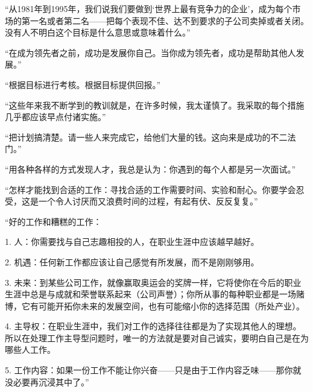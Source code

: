 “从1981年到1995年，我们说我们要做到‘世界上最有竞争力的企业’，成为每个市场的第一名或者第二名——把每个表现不佳、达不到要求的子公司卖掉或者关闭。没有人不明白这个目标是什么意思或意味着什么。”
\par

“在成为领先者之前，成功是发展你自己。当你成为领先者，成功是帮助其他人发展。”
\par

“根据目标进行考核。根据目标提供回报。”
\par

“这些年来我不断学到的教训就是，在许多时候，我太谨慎了。我采取的每个措施几乎都应该早点付诸实施。”
\par

“把计划搞清楚。请一些人来完成它，给他们大量的钱。这向来是成功的不二法门。”
\par

“用各种各样的方式发现人才，我总是认为：你遇到的每个人都是另一次面试。”
\par

“怎样才能找到合适的工作：寻找合适的工作需要时间、实验和耐心。你要学会忍受，这是一个令人讨厌而又浪费时间的过程，有起有伏、反反复复。”
\par

“好的工作和糟糕的工作：
\par

1. 人：你需要找与自己志趣相投的人，在职业生涯中应该越早越好。
\par

2. 机遇：任何新工作都应该让自己感觉有所发展，而不是刚刚够用。
\par

3. 未来：到某些公司工作，就像赢取奥运会的奖牌一样，它将使你在今后的职业生涯中总是与成就和荣誉联系起来（公司声誉）；你所从事的每种职业都是一场赌博，它有可能开拓你未来的发展空间，也有可能缩小你的选择范围（所处产业）。
\par

4. 主导权：在职业生涯中，我们对工作的选择往往都是为了实现其他人的理想。所以在处理工作主导型问题时，唯一的方法就是要对自己诚实，要明白自己是在为哪些人工作。
\par

5. 工作内容：如果一份工作不能让你兴奋——只是由于工作内容乏味——那你就没必要再沉浸其中了。”
\par
